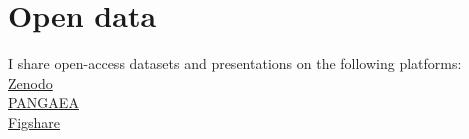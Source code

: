 \documentclass[%
               doublesided,
               paper=a4,
               fontsize=10pt
              ]{my-resume}
\begin{document}
{    \vspace{0.5em}
    \bigskip
    
    \section[\faUnlock]{Open data}
    I share open-access datasets and presentations on the following platforms:\\
    \faExternalLink \hspace{0.5em} \href{https://zenodo.org/search?page=1&size=20&q=creators.orcid:(0000-0001-5575-1168)&sort=mostrecent}{Zenodo}\\
    \faExternalLink \hspace{0.5em} \href{https://www.pangaea.de/?q=Rovere\%2C+Alessio&f.author\%5B\%5D=Rovere\%2C+Alessio}{PANGAEA}\\
    \faExternalLink \hspace{0.5em} \href{https://figshare.com/authors/Alessio_Rovere/1379355}{Figshare}\\
    }
\end{document}
